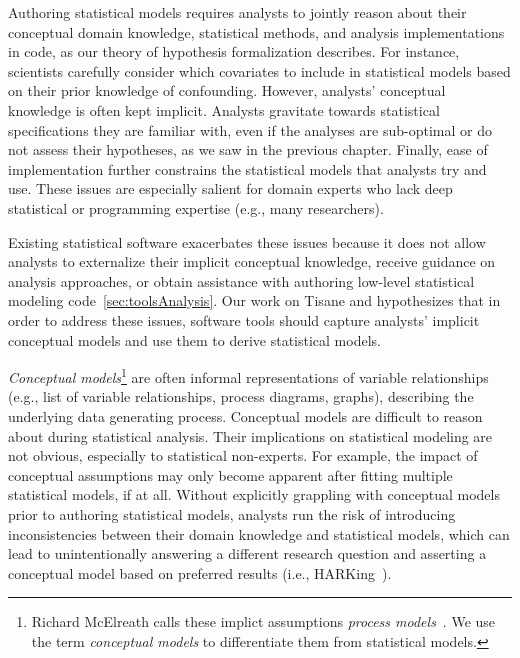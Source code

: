 \def\adult{\texttt{adult}\xspace}
\def\poundslost{\texttt{pounds\_lost}\xspace}
\def\motivation{\texttt{motivation}\xspace}
\def\regimen{\texttt{regimen\_condition}\xspace}
\def\regimencondition{\texttt{regimen\_condition}\xspace}
\def\group{\texttt{group}\xspace}
\def\age{\texttt{age}\xspace}


Authoring statistical models requires analysts to jointly reason about their
conceptual domain knowledge, statistical methods, and analysis implementations
in code, as our theory of hypothesis formalization describes. For instance,
scientists carefully consider which covariates to include in statistical models
based on their prior knowledge of confounding. However, analysts' conceptual
knowledge is often kept implicit. Analysts gravitate towards statistical
specifications they are familiar with, even if the analyses are sub-optimal or
do not assess their hypotheses, as we saw in the previous chapter. Finally, ease
of implementation further constrains the statistical models that analysts try
and use. These issues are especially salient for domain experts who lack deep
statistical or programming expertise (e.g., many researchers).

Existing statistical software exacerbates these issues because it does not allow
analysts to externalize their implicit conceptual knowledge, receive guidance on
analysis approaches, or obtain assistance with authoring low-level statistical modeling
code~\autoref{sec:toolsAnalysis}. Our work on Tisane and \rTisane hypothesizes that in order
to address these issues, software tools should capture analysts' implicit
conceptual models and use them to derive statistical models. 

\textit{Conceptual models}\footnote{Richard McElreath calls these implict
assumptions \textit{process models}~\cite{mcelreath2020statistical}. We use the
term \textit{conceptual models} to differentiate them from statistical models.}
are often informal representations of variable relationships (e.g., list of
variable relationships, process diagrams, graphs), describing the underlying
data generating process. Conceptual models are difficult to reason about during
statistical analysis. Their implications on statistical modeling are not
obvious, especially to statistical non-experts. For example, the impact of
conceptual assumptions may only become apparent after fitting multiple
statistical models, if at all. Without explicitly grappling with conceptual
models prior to authoring statistical models, analysts run the risk of
introducing inconsistencies between their domain knowledge and statistical
models, which can lead to unintentionally answering a different research
question and asserting a conceptual model based on preferred results (i.e.,
HARKing~\cite{kerr1998harking}). 

